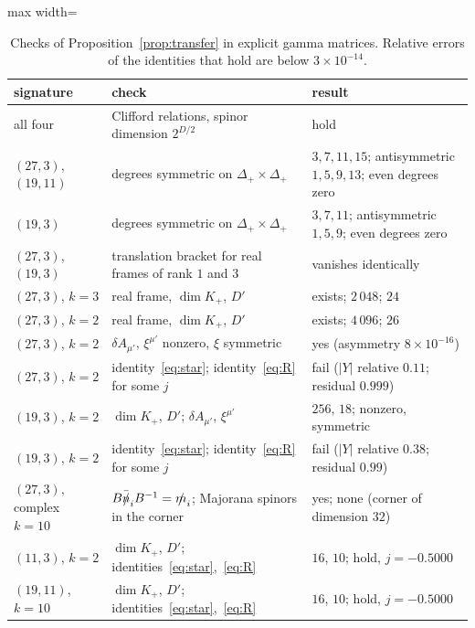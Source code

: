 \begin{table}[htbp]
\centering
\begin{adjustbox}{max width=\linewidth}\begin{tabular}{@{}lll@{}}
\toprule
signature & check & result\\
\midrule
all four & Clifford relations, spinor dimension $2^{D/2}$ & hold\\
$(27,3)$, $(19,11)$ & degrees symmetric on $\Delta_+\times\Delta_+$ & $3,7,11,15$; antisymmetric $1,5,9,13$; even degrees zero\\
$(19,3)$ & degrees symmetric on $\Delta_+\times\Delta_+$ & $3,7,11$; antisymmetric $1,5,9$; even degrees zero\\
$(27,3)$, $(19,3)$ & translation bracket for real frames of rank $1$ and $3$ & vanishes identically\\
$(27,3)$, $k=3$ & real frame, $\dim K_+$, $D'$ & exists; $2\,048$; $24$\\
$(27,3)$, $k=2$ & real frame, $\dim K_+$, $D'$ & exists; $4\,096$; $26$\\
$(27,3)$, $k=2$ & $\delta A_{\mu'}$, $\xi^{\mu'}$ nonzero, $\xi$ symmetric & yes (asymmetry $8\times10^{-16}$)\\
$(27,3)$, $k=2$ & identity~\eqref{eq:star}; identity~\eqref{eq:R} for some $j$ & fail ($|Y|$ relative $0.11$; residual $0.999$)\\
$(19,3)$, $k=2$ & $\dim K_+$, $D'$; $\delta A_{\mu'}$, $\xi^{\mu'}$ & $256$, $18$; nonzero, symmetric\\
$(19,3)$, $k=2$ & identity~\eqref{eq:star}; identity~\eqref{eq:R} for some $j$ & fail ($|Y|$ relative $0.38$; residual $0.99$)\\
$(27,3)$, complex $k=10$ & $B\bar{\slashed{n}}_iB^{-1}=\slashed{m}_i$; Majorana spinors in the corner & yes; none (corner of dimension $32$)\\
$(11,3)$, $k=2$ & $\dim K_+$, $D'$; identities~\eqref{eq:star},~\eqref{eq:R} & $16$, $10$; hold, $j=-0.5000$\\
$(19,11)$, $k=10$ & $\dim K_+$, $D'$; identities~\eqref{eq:star},~\eqref{eq:R} & $16$, $10$; hold, $j=-0.5000$\\
\bottomrule
\end{tabular}\end{adjustbox}
\caption{Checks of Proposition~\ref{prop:transfer} in explicit gamma matrices. Relative errors of the identities that hold are below $3\times10^{-14}$.}
\label{tab:transfercheck}
\end{table}

\FloatBarrier
